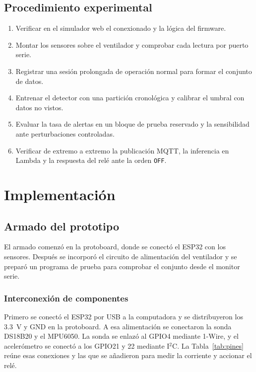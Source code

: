 \documentclass[10pt,twocolumn]{article}
\newcommand{\code}[1]{\texttt{\small #1}}
\begin{document}
\subsection{Procedimiento experimental}
\begin{enumerate}
  \item Verificar en el simulador web el conexionado y la lógica del firmware.
  \item Montar los sensores sobre el ventilador y comprobar cada lectura por puerto serie.
  \item Registrar una sesión prolongada de operación normal para formar el conjunto de datos.
  \item Entrenar el detector con una partición cronológica y calibrar el umbral con datos no
        vistos.
  \item Evaluar la tasa de alertas en un bloque de prueba reservado y la sensibilidad ante
        perturbaciones controladas.
  \item Verificar de extremo a extremo la publicación MQTT, la inferencia en Lambda y la
        respuesta del relé ante la orden \code{OFF}.
\end{enumerate}

\section{Implementación}
\label{sec:implementacion}

\subsection{Armado del prototipo}

El armado comenzó en la protoboard, donde se conectó el ESP32 con los sensores. Después se incorporó el circuito de alimentación del ventilador y se preparó un programa de prueba para comprobar el conjunto desde el monitor serie.

\subsubsection{Interconexión de componentes}
Primero se conectó el ESP32 por USB a la computadora y se distribuyeron los 3.3~V y GND en la protoboard. A esa alimentación se conectaron la sonda DS18B20 y el MPU6050. La sonda se enlazó al GPIO4 mediante 1-Wire, y el acelerómetro se conectó a los GPIO21 y 22 mediante I$^2$C. La Tabla~\ref{tab:pines} reúne esas conexiones y las que se añadieron para medir la corriente y accionar el relé.
\end{document}
